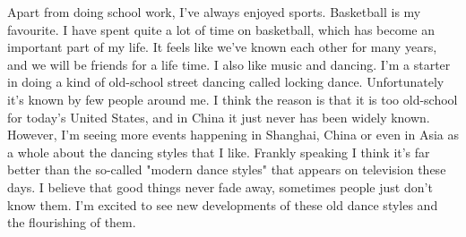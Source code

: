 \documentclass[paper=letter, fontsize=11pt]{scrartcl}
\numberwithin{equation}{section}		%
\numberwithin{figure}{section}			%
\numberwithin{table}{section}			%
\begin{document}
Apart from doing school work, I've always enjoyed sports. Basketball is my favourite. I have spent quite a lot of time on basketball, which has become an important part of my life. It feels like we've known each other for many years, and we will be friends for a life time. I also like music and dancing. I'm a starter in doing a kind of old-school street dancing called locking dance. Unfortunately it's known by few people around me. I think the reason is that it is too old-school for today's United States, and in China it just never has been widely known. However, I'm seeing more events happening in Shanghai, China or even in Asia as a whole about the dancing styles that I like. Frankly speaking I think it's far better than the so-called "modern dance styles" that appears on television these days. I believe that good things never fade away, sometimes people just don't know them. I'm excited to see new developments of these old dance styles and the flourishing of them.
\pagebreak
\end{document}
